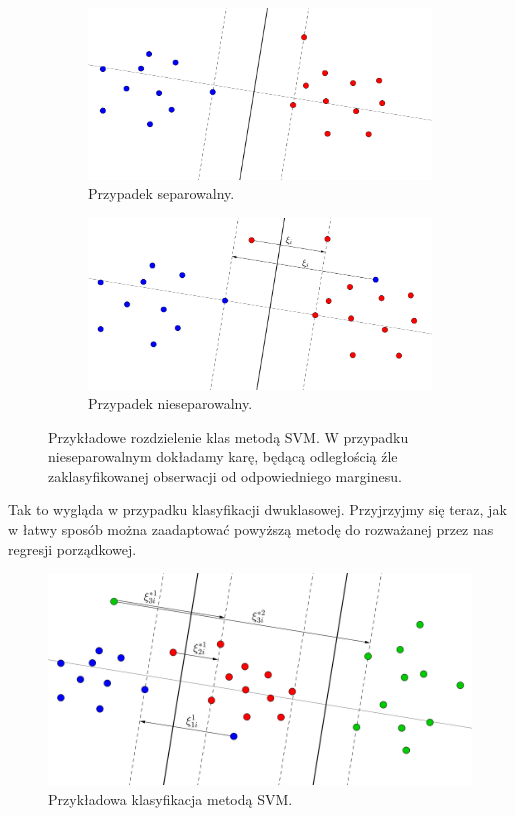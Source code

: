 \documentclass{mini}
\begin{document}
\begin{figure}[]
  \begin{subfigure}[]{\textwidth}
    \includegraphics[width=\textwidth]{graphics/svm1.png}
    \caption{Przypadek separowalny.}
  \end{subfigure}
  \begin{subfigure}[]{\textwidth}
    \includegraphics[width=\textwidth]{graphics/svm1eps.png}
    \caption{Przypadek nieseparowalny.}
  \end{subfigure}
  \caption{Przykładowe rozdzielenie klas metodą SVM. W przypadku nieseparowalnym dokładamy karę, będącą odległością źle zaklasyfikowanej obserwacji od odpowiedniego marginesu.}
  \label{svm1}
\end{figure}

Tak to wygląda w przypadku klasyfikacji dwuklasowej. Przyjrzyjmy się teraz, jak w łatwy sposób można zaadaptować powyższą metodę do rozważanej przez nas regresji porządkowej.

\begin{figure}[h]
\begin{center}
\includegraphics[width=\textwidth]{graphics/svm3.png}
\end{center}
\caption{Przykładowa klasyfikacja metodą SVM.}
\label{svm}
\end{figure}
\end{document}
